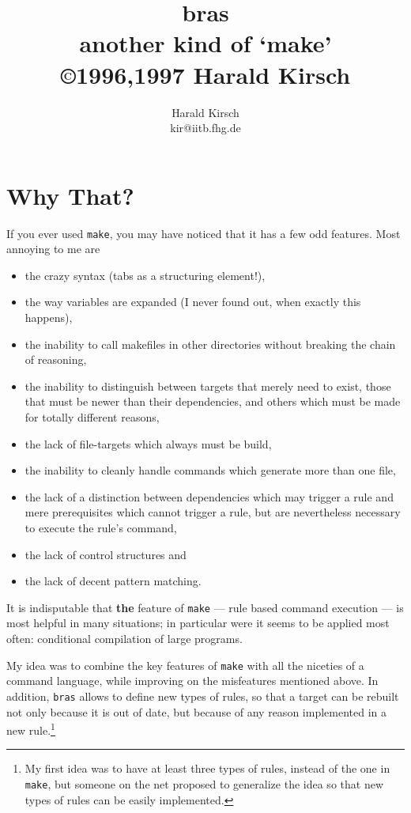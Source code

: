 \documentclass[12pt]{article}
\title{\textsf{bras}\\
another kind of `make'\\
\small \copyright 1996,1997 Harald Kirsch}
\author{\relax
Harald Kirsch\\
kir@iitb.fhg.de}
\newcommand{\bras}{\texttt{bras}}
\newcommand{\make}{\texttt{make}}
\begin{document}
\maketitle
\tableofcontents

\section{Why That?}
If you ever used \texttt{make}, you may have noticed that it has a few
odd features. Most annoying to me are
\begin{itemize}
\item the crazy syntax (tabs as a structuring element!),
\item the way variables are expanded (I never found out, when exactly
this happens),
\item the inability to call makefiles in other directories without
breaking the chain of reasoning,
\item the inability to distinguish between targets that merely need to
  exist, those that must be newer than their dependencies, and others
  which must be made for totally different reasons,
\item the lack of file-targets which always must be build,
\item the inability to cleanly handle commands which generate more
than one file,
\item the lack of a distinction between dependencies which may trigger
a rule and mere prerequisites which cannot trigger a rule, but are
nevertheless necessary to execute the rule's command,
\item the lack of control structures and 
\item the lack of decent pattern matching.
\end{itemize}

It is indisputable that \textbf{the} feature of \texttt{make} ---
rule based command execution --- is most helpful in many situations;
in particular were it seems to be applied most often:
conditional compilation of large programs.

My idea was to combine the key features of \texttt{make} with all the
niceties of a command language, while improving on the misfeatures
mentioned above. In addition, \bras{} allows to define new types of
rules, so that a target can be rebuilt not only because it is out of
date, but because of any reason implemented in a new rule.\footnote{My
first idea was to have at least three types of rules, instead of the one
in \make{}, but someone on the net proposed to generalize the idea so
that new types of rules can be easily implemented.}
\end{document}
